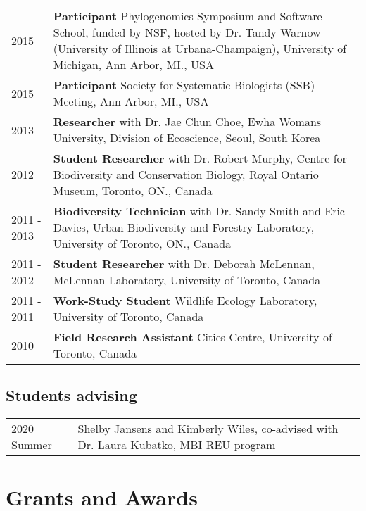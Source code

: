\documentclass[11pt]{article}
\begin{document}
\begin{longtable}{p{}  p{}}
2015 &	\textbf{Participant} Phylogenomics Symposium and Software School, funded by NSF, hosted by Dr. Tandy Warnow (University of Illinois at Urbana-Champaign), University of Michigan, Ann Arbor, MI., USA\\
2015 &	\textbf{Participant} Society for Systematic Biologists (SSB) Meeting, Ann Arbor, MI., USA\\
2013 &	\textbf{Researcher} with Dr. Jae Chun Choe, Ewha Womans University, Division of Ecoscience, Seoul, South Korea\\
2012 &	\textbf{Student Researcher} with Dr. Robert Murphy, Centre for Biodiversity and Conservation Biology, Royal Ontario Museum, Toronto, ON., Canada\\
2011 - 2013 &	\textbf{Biodiversity Technician} with Dr. Sandy Smith and Eric Davies, Urban Biodiversity and Forestry Laboratory, University of Toronto, ON., Canada\\
2011 - 2012 &	\textbf{Student Researcher} with Dr. Deborah McLennan, McLennan Laboratory, University of Toronto, Canada\\
2011 - 2011&	\textbf{Work-Study Student} Wildlife Ecology Laboratory, University of Toronto, Canada\\
2010 & \textbf{Field Research Assistant} Cities Centre, University of Toronto, Canada\\

\end{longtable}

\subsection*{Students advising}

\begin{longtable}{p{}  p{}}

2020 Summer&Shelby Jansens and Kimberly Wiles, co-advised with Dr. Laura Kubatko, MBI REU program\\

\end{longtable}

\hspace{0pt}
\section*{Grants and Awards}
\end{document}
